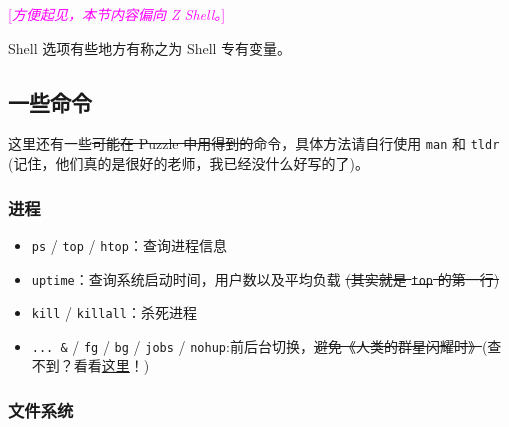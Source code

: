 \documentclass{article}
\begin{document}
	\textcolor{fuchsia}{[\textit{方便起见，本节内容偏向 Z Shell。}]}

	Shell 选项有些地方有称之为 Shell 专有变量。

	\subsection{一些命令}

	这里还有一些\sout{可能在 Puzzle 中用得到的}命令，具体方法请自行使用 \texttt{man} 和 \texttt{tldr} (记住，他们真的是很好的老师，我已经没什么好写的了)。

	\subsubsection{进程}

	\begin{itemize}
		\itemsep0pt
		\item \texttt{ps} / \texttt{top} / \texttt{htop}：查询进程信息
		\item \texttt{uptime}：查询系统启动时间，用户数以及平均负载 \sout{(其实就是 \texttt{top} 的第一行)}
		\item \texttt{kill} / \texttt{killall}：杀死进程
		\item \texttt{... \&} / \texttt{fg} / \texttt{bg} / \texttt{jobs} / \texttt{nohup}:前后台切换，\sout{避免《人类的群星闪耀时》}(查不到？看看\hyperref[item:docbuiltin]{这里}！)
	\end{itemize}

	\subsubsection{文件系统}
\end{document}
